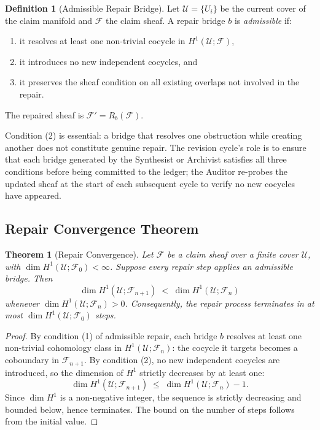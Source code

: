 \documentclass[12pt, a4paper]{article}
\theoremstyle{plain}
\newtheorem{theorem}{Theorem}
\theoremstyle{definition}
\newtheorem{definition}{Definition}
\theoremstyle{remark}
\begin{document}
\begin{definition}[Admissible Repair Bridge]
Let $\mathcal{U} = \{U_i\}$ be the current cover of the claim manifold and $\mathcal{F}$ the claim sheaf. A repair bridge $b$ is \emph{admissible} if:
\begin{enumerate}
\item it resolves at least one non-trivial cocycle in $H^1(\mathcal{U}; \mathcal{F})$,
\item it introduces no new independent cocycles, and
\item it preserves the sheaf condition on all existing overlaps not involved in the repair.
\end{enumerate}
The repaired sheaf is $\mathcal{F}' = R_b(\mathcal{F})$.
\end{definition}

Condition (2) is essential: a bridge that resolves one obstruction while creating another does not constitute genuine repair. The revision cycle's role is to ensure that each bridge generated by the Synthesist or Archivist satisfies all three conditions before being committed to the ledger; the Auditor re-probes the updated sheaf at the start of each subsequent cycle to verify no new cocycles have appeared.

\subsection{Repair Convergence Theorem}

\begin{theorem}[Repair Convergence]
\label{thm:repair}
Let $\mathcal{F}$ be a claim sheaf over a finite cover $\mathcal{U}$, with $\dim H^1(\mathcal{U}; \mathcal{F}_0) < \infty$. Suppose every repair step applies an admissible bridge. Then
\[
\dim H^1(\mathcal{U}; \mathcal{F}_{n+1}) \;<\; \dim H^1(\mathcal{U}; \mathcal{F}_n)
\]
whenever $\dim H^1(\mathcal{U}; \mathcal{F}_n) > 0$. Consequently, the repair process terminates in at most $\dim H^1(\mathcal{U}; \mathcal{F}_0)$ steps.
\end{theorem}

\begin{proof}
By condition (1) of admissible repair, each bridge $b$ resolves at least one non-trivial cohomology class in $H^1(\mathcal{U}; \mathcal{F}_n)$: the cocycle it targets becomes a coboundary in $\mathcal{F}_{n+1}$. By condition (2), no new independent cocycles are introduced, so the dimension of $H^1$ strictly decreases by at least one:
\[
\dim H^1(\mathcal{U}; \mathcal{F}_{n+1}) \;\leq\; \dim H^1(\mathcal{U}; \mathcal{F}_n) - 1.
\]
Since $\dim H^1$ is a non-negative integer, the sequence is strictly decreasing and bounded below, hence terminates. The bound on the number of steps follows from the initial value.
\end{proof}
\end{document}
